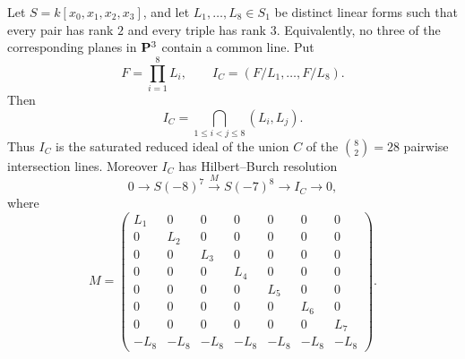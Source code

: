 
\begin{theorem}\label{thm:hodgecy-ii-eight-plane-line-skeleton}
Let \(S=k[x_0,x_1,x_2,x_3]\), and let
\(L_1,\ldots,L_8\in S_1\) be distinct linear forms such that every
pair has rank \(2\) and every triple has rank \(3\).  Equivalently, no
three of the corresponding planes in \({\bf P}^3\) contain a common
line.  Put
\[
  F=\prod_{i=1}^8 L_i,
  \qquad
  I_C=(F/L_1,\ldots,F/L_8).
\]
Then
\[
  I_C=\bigcap_{1\le i<j\le 8}(L_i,L_j).
\]
Thus \(I_C\) is the saturated reduced ideal of the union \(C\) of the
\(\binom{8}{2}=28\) pairwise intersection lines.  Moreover \(I_C\) has
Hilbert--Burch resolution
\[
  0 \longrightarrow S(-8)^7
    \xrightarrow{\,M\,}
  S(-7)^8
    \longrightarrow I_C
    \longrightarrow 0,
\]
where
\[
M=
\begin{pmatrix}
L_1&0&0&0&0&0&0\\
0&L_2&0&0&0&0&0\\
0&0&L_3&0&0&0&0\\
0&0&0&L_4&0&0&0\\
0&0&0&0&L_5&0&0\\
0&0&0&0&0&L_6&0\\
0&0&0&0&0&0&L_7\\
-L_8&-L_8&-L_8&-L_8&-L_8&-L_8&-L_8
\end{pmatrix}.
\]
\end{theorem}

